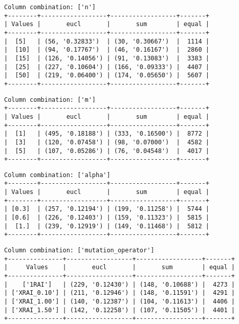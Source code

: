 \documentclass{article}
\begin{document}
\begin{verbatim}
Column combination: ['n']
+--------+------------------+------------------+-------+
| Values |       eucl       |       sum        | equal |
+--------+------------------+------------------+-------+
|  [5]   | (56, '0.32833')  | (30, '0.30667')  |  1114 |
|  [10]  | (94, '0.17767')  | (46, '0.16167')  |  2860 |
|  [15]  | (126, '0.14056') | (91, '0.13083')  |  3383 |
|  [25]  | (227, '0.10604') | (166, '0.09333') |  4407 |
|  [50]  | (219, '0.06400') | (174, '0.05650') |  5607 |
+--------+------------------+------------------+-------+
\end{verbatim}

\begin{verbatim}
Column combination: ['m']
+--------+------------------+------------------+-------+
| Values |       eucl       |       sum        | equal |
+--------+------------------+------------------+-------+
|  [1]   | (495, '0.18188') | (333, '0.16500') |  8772 |
|  [3]   | (120, '0.07458') | (98, '0.07000')  |  4582 |
|  [5]   | (107, '0.05286') | (76, '0.04548')  |  4017 |
+--------+------------------+------------------+-------+
\end{verbatim}

\begin{verbatim}
Column combination: ['alpha']
+--------+------------------+------------------+-------+
| Values |       eucl       |       sum        | equal |
+--------+------------------+------------------+-------+
| [0.3]  | (257, '0.12194') | (199, '0.11258') |  5744 |
| [0.6]  | (226, '0.12403') | (159, '0.11323') |  5815 |
|  [1.]  | (239, '0.12919') | (149, '0.11468') |  5812 |
+--------+------------------+------------------+-------+
\end{verbatim}

\begin{verbatim}
Column combination: ['mutation_operator']
+---------------+------------------+------------------+-------+
|     Values    |       eucl       |       sum        | equal |
+---------------+------------------+------------------+-------+
|    ['1RAI']   | (229, '0.12430') | (148, '0.10688') |  4273 |
| ['XRAI_0.10'] | (211, '0.12946') | (148, '0.11591') |  4291 |
| ['XRAI_1.00'] | (140, '0.12387') | (104, '0.11613') |  4406 |
| ['XRAI_1.50'] | (142, '0.12258') | (107, '0.11505') |  4401 |
+---------------+------------------+------------------+-------+
\end{verbatim}
\end{document}
